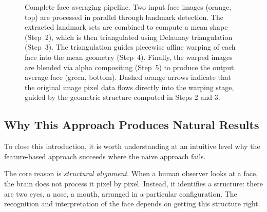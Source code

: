 \begin{figure}[htbp]
    \caption{Complete face averaging pipeline. Two input face images (orange, top) are processed
    in parallel through landmark detection. The extracted landmark sets are combined to compute a
    mean shape (Step~2), which is then triangulated using Delaunay triangulation (Step~3).
    The triangulation guides piecewise affine warping of each face into the mean geometry
    (Step~4). Finally, the warped images are blended via alpha compositing (Step~5) to produce
    the output average face (green, bottom). Dashed orange arrows indicate that the original
    image pixel data flows directly into the warping stage, guided by the geometric structure
    computed in Steps 2 and 3.}
    \label{fig:pipeline}
\end{figure}

\subsection{Why This Approach Produces Natural Results}

To close this introduction, it is worth understanding at an intuitive level why the feature-based
approach succeeds where the naive approach fails.

The core reason is \emph{structural alignment}. When a human observer looks at a face, the brain
does not process it pixel by pixel. Instead, it identifies a structure: there are two eyes, a nose,
a mouth, arranged in a particular configuration. The recognition and interpretation of the face
depends on getting this structure right.

